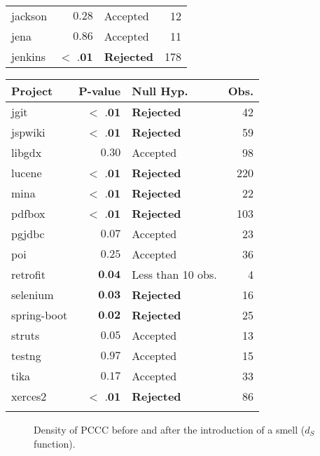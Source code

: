 \begin{table}[]
\begin{tabular}{l|r|l|r}
        jackson & $ 0.28 $& Accepted & 12\\
        jena & $ 0.86 $& Accepted & 11\\
        jenkins & $<$ $\textbf{.01}$ & \textbf{Rejected} & 178\\
        \bottomrule
    \end{tabular}
    \quad
    \begin{tabular}{l|r|l|r}
        \toprule
        \textbf{Project} & \textbf{P-value} & \textbf{Null Hyp.} & \textbf{Obs.}\\
        \midrule
        jgit & $<$ $\textbf{.01}$ & \textbf{Rejected} & 42\\
        jspwiki & $<$ $\textbf{.01}$ & \textbf{Rejected} & 59\\
        libgdx & $ 0.30 $& Accepted & 98\\
        lucene & $<$ $\textbf{.01}$ & \textbf{Rejected} & 220\\
        mina & $<$ $\textbf{.01}$ & \textbf{Rejected} & 22\\
        pdfbox & $<$ $\textbf{.01}$ & \textbf{Rejected} & 103\\
        pgjdbc & $ 0.07 $& Accepted & 23\\
        poi & $ 0.25 $& Accepted & 36\\
        retrofit & $ \textbf{0.04} $& Less than 10 obs. & 4\\
        selenium & $ \textbf{0.03} $ & \textbf{Rejected} & 16\\
        spring-boot & $ \textbf{0.02} $& \textbf{Rejected} & 25\\
        struts & $ 0.05 $& Accepted & 13\\
        testng & $ 0.97 $& Accepted & 15\\
        tika & $ 0.17 $& Accepted & 33\\
        xerces2 & $<$ $\textbf{.01}$ & \textbf{Rejected} & 86\\
        & \\
        \bottomrule
    \end{tabular}
\end{table}

\begin{figure}%
    \centering
    \qquad
    \caption{Density of PCCC before and after the introduction of a smell ($d_S$ function).}%
    \label{c5:fig:rq2-density}%
\end{figure}

